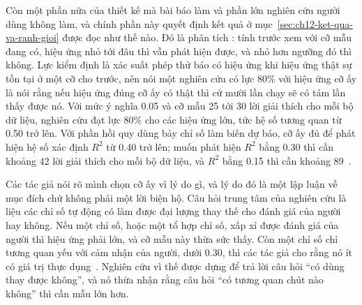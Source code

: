 %
Còn một phần nữa của thiết kế mà bài báo làm và phần lớn nghiên cứu người dùng
không làm, và chính phần này quyết định kết quả ở
mục~\ref{sec:ch12-ket-qua-va-ranh-gioi} được đọc như thế nào. Đó là phân tích
: tính trước xem với cỡ mẫu đang có, hiệu
ứng nhỏ tới đâu thì vẫn phát hiện được, và nhỏ hơn ngưỡng đó thì không. Lực
kiểm định là xác suất phép thử báo có hiệu ứng khi hiệu ứng thật sự tồn tại ở
một cỡ cho trước, nên nói một nghiên cứu có lực 80\% với hiệu ứng cỡ ấy là nói
rằng nếu hiệu ứng đúng cỡ ấy có thật thì cứ mười lần chạy sẽ có tám lần thấy
được nó. Với mức ý nghĩa 0.05 và cỡ mẫu 25 tới 30 lời giải thích cho mỗi bộ dữ
liệu, nghiên cứu đạt lực 80\% cho các hiệu ứng lớn, tức hệ số tương quan từ
0.50 trở lên. Với phần hồi quy dùng bảy chỉ số làm biến dự báo, cỡ ấy đủ để phát
hiện hệ số xác định $R^2$ từ 0.40 trở lên; muốn phát hiện $R^2$ bằng 0.30 thì
cần khoảng 42 lời giải thích cho mỗi bộ dữ liệu, và $R^2$ bằng 0.15 thì cần
khoảng 89~\autocite{p25userperception}.

Các tác giả nói rõ mình chọn cỡ ấy vì lý do gì, và lý do đó là một lập luận về
mục đích chứ không phải một lời biện hộ. Câu hỏi trung tâm của nghiên cứu là
liệu các chỉ số tự động có làm được đại lượng thay thế cho đánh giá của người
hay không. Nếu một chỉ số, hoặc một tổ hợp chỉ số, xấp xỉ được đánh giá của
người thì hiệu ứng phải lớn, và cỡ mẫu này thừa sức thấy. Còn một chỉ số chỉ
tương quan yếu với cảm nhận của người, dưới 0.30, thì các tác giả cho rằng nó
ít có giá trị thực dụng~\autocite{p25userperception}. Nghiên cứu vì thế được
dựng để trả lời câu hỏi \enquote{có dùng thay được không}, và nó thừa nhận
rằng câu hỏi \enquote{có tương quan chút nào không} thì cần mẫu lớn hơn.
